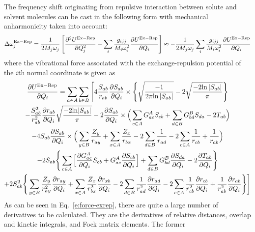 \documentclass[a4paper,titlepage,twoside,fleqn,12pt]{book}
\newcommand{\fderiv}[2]{\ensuremath{
    \frac{\partial #1}{\partial #2}}}
\newcommand{\sderiv}[2]{\ensuremath{
    \frac{\partial^2 #1}{\partial #2^2}
    }}
\begin{document}
\begin{refsection}
The frequency shift originating from repulsive interaction between 
solute and solvent molecules can be cast in the following form 
with mechanical anharmonicity taken into account: 
%
\begin{equation}\label{e:dw-exrep-base}
\Delta \omega_j^{\rm Ex-Rep} =
\frac{1}{2M_j\omega_j} \left[ 
\sderiv{U^{\rm Ex-Rep}}{Q_j} -
\sum_i \frac{g_{ijj}}{M_i\omega_i^2}\fderiv{U^{\rm Ex-Rep}}{Q_i}
\right]
\approx 
-\frac{1}{2M_j\omega_j}\sum_i \frac{g_{ijj}}{M_i\omega_i^2}\fderiv{U^{\rm Ex-Rep}}{Q_i}
\end{equation}
%
where the vibrational force associated with the exchange\hyp{}repulsion 
potential of the $i$th normal coordinate is given as
%
\begin{multline}\label{e:force-exrep}
\fderiv{U^{\rm Ex-Rep}}{Q_i} = 
\sum_{a \in A}\sum_{b \in B} 
\Bigg[ 4
   \frac{S_{ab}}{r_{ab}}
   \fderiv{S_{ab}}{Q_i}
   \times
   \Bigg\{
       \sqrt{\frac{-1}{2\pi{\rm ln}\left|S_{ab}\right|}} - 2\sqrt{\frac{-2{\rm ln}\left|S_{ab}\right|}{\pi}}
   \Bigg\} \\
   -\frac{S_{ab}^2}{r_{ab}^2}
   \fderiv{r_{ab}}{Q_i}
   \sqrt{\frac{-2{\rm ln}|S_{ab}|}{\pi}}
   - 2\fderiv{S_{ab}}{Q_i} 
   \times
   \Big( 
       \sum_{c \in A} G^A_{ac} S_{cb} + 
       \sum_{d \in B} G^B_{bd} S_{da} - 2 T_{ab} 
   \Big) \\
   -4S_{ab} \fderiv{S_{ab}}{Q_i}
   \times
   \Big( \sum_{y \in B} \frac{Z_y}{r_{ay}} 
       + \sum_{x \in A} \frac{Z_x}{r_{bx}} - 2\sum_{d \in B} \frac{1}{r_{ad}}
       - 2\sum_{c \in A} \frac{1}{r_{cb}} + \frac{1}{r_{ab}}
   \Big) \\%
   - 2S_{ab}
   \Bigg\{ 
       \sum_{c \in A} 
       \Big[
          \fderiv{G^A_{ac}}{Q_i} S_{cb}  +  G^A_{ac} \fderiv{S_{cb}}{Q_i}
       \Big] +
       \sum_{d \in B} G^B_{bd} \fderiv{S_{da}}{Q_i} - 2 \fderiv{T_{ab}}{Q_i}
   \Bigg\} \\
   + 2S^2_{ab} 
   \Bigg\{ 
      \sum_{y \in B} \frac{Z_y}{r_{ay}^2} \fderiv{r_{ay}}{Q_i} +
      \sum_{x \in A} \frac{Z_x}{r_{bx}^2} \fderiv{r_{xb}}{Q_i} -
      2\sum_{d \in B} \frac{1}{r_{ad}^2} \fderiv{r_{ad}}{Q_i} %
    - 2\sum_{c \in A} \frac{1}{r_{cb}^2} \fderiv{r_{cb}}{Q_i} + \frac{1}{r_{ab}^2} \fderiv{r_{ab}}{Q_i}
   \Bigg\}
\Bigg]
\end{multline}
%
As can be seen in Eq.~\eqref{e:force-exrep}, there are quite a large number of derivatives 
to be calculated. They are the derivatives of relative distances, 
overlap and kinetic integrals, and Fock matrix elements. The former 

\end{refsection}
\end{document}
